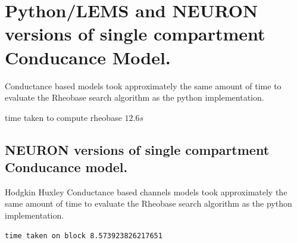 \section{Python/LEMS and NEURON versions of single compartment Conducance Model.}

Conductance based models took approximately the same amount of
time to evaluate the Rheobase search algorithm as the python
implementation.


time taken to compute rheobase $ 12.6s $




\subsection{NEURON versions of single compartment Conducance
model.}

Hodgkin Huxley Conductance based channels models took approximately the same amount of time to evaluate the Rheobase search algorithm as the python implementation.



    \begin{verbatim}
time taken on block 8.573923826217651
    \end{verbatim}


    
